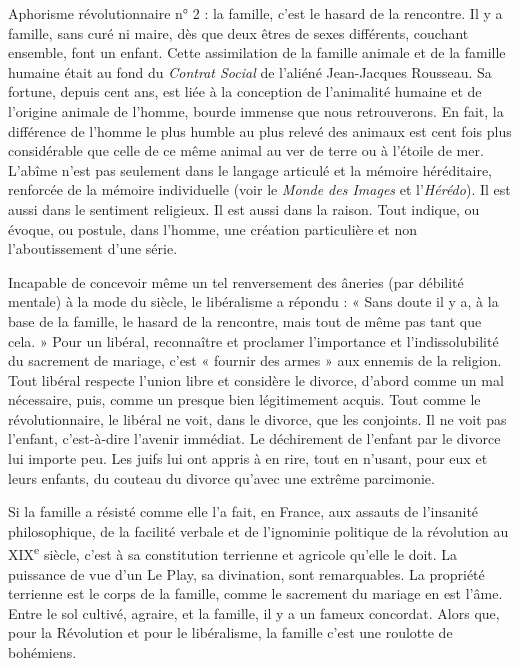 \documentclass[french,twoside]{book} %
\begin{document}
Aphorisme révolutionnaire n° 2 : la famille, c’est le hasard de la rencontre. Il y a famille, sans curé ni maire, dès que deux êtres de sexes différents, couchant ensemble, font un enfant. Cette assimilation de la famille animale et de la famille humaine était au fond du {\itshape Contrat Social} de l’aliéné Jean-Jacques Rousseau. Sa fortune, depuis cent ans, est liée à la conception de l’animalité humaine et de l’origine animale de l’homme, bourde immense que nous retrouverons. En fait, la différence de l’homme le plus humble au plus relevé des animaux est cent fois plus considérable que celle de ce même animal au ver de terre ou à l’étoile de mer. L’abîme n’est pas seulement dans le langage articulé et la mémoire héréditaire, renforcée de la mémoire individuelle (voir le {\itshape Monde des Images} et l’{\itshape Hérédo}). Il est aussi dans le sentiment religieux. Il est aussi dans la raison. Tout indique, ou évoque, ou postule, dans l’homme, une création particulière et non l’aboutissement d’une série.\par
Incapable de concevoir même un tel renversement des âneries (par débilité mentale) à la mode du siècle, le libéralisme a répondu : « Sans doute il y a, à la base de la famille, le hasard de la rencontre, mais tout de même pas tant que cela. » Pour un libéral, reconnaître et proclamer l’importance et l’indissolubilité du sacrement de mariage, c’est « fournir des armes » aux ennemis de la religion. Tout libéral respecte l’union libre et considère le divorce, d’abord comme un mal nécessaire, puis, comme un presque bien légitimement acquis. Tout comme le révolutionnaire, le libéral ne voit, dans le divorce, que les conjoints. Il ne voit pas l’enfant, c’est-à-dire l’avenir immédiat. Le déchirement de l’enfant par le divorce lui importe peu. Les juifs lui ont appris à en rire, tout en n’usant, pour eux et leurs enfants, du couteau du divorce qu’avec une extrême parcimonie.\par
Si la famille a résisté comme elle l’a fait, en France, aux assauts de l’insanité philosophique, de la facilité verbale et de l’ignominie politique de la révolution au XIX\textsuperscript{e} siècle, c’est à sa constitution terrienne et agricole qu’elle le doit. La puissance de vue d’un Le Play, sa divination, sont remarquables. La propriété terrienne est le corps de la famille, comme le sacrement du mariage en est l’âme. Entre le sol cultivé, agraire, et la famille, il y a un fameux concordat. Alors que, pour la Révolution et pour le libéralisme, la famille c’est une roulotte de bohémiens.\par
\end{document}
